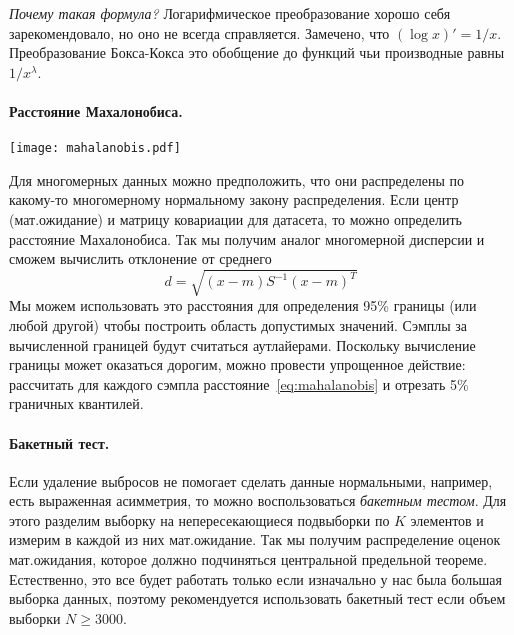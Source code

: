 \documentclass[../handbook.tex]{subfiles}
\begin{document}
{\it Почему такая формула?} Логарифмическое преобразование хорошо себя
зарекомендовало, но оно не всегда справляется. Замечено, что $(\log x)' =
1/x$. Преобразование Бокса-Кокса это обобщение до функций чьи производные
равны $1/x^\lambda$.

\paragraph{Расстояние Махалонобиса.}
\begin{marginfigure}
    \texttt{[image: mahalanobis.pdf]}
\end{marginfigure}
Для многомерных данных можно предположить, что они распределены по какому-то многомерному нормальному закону распределения. Если центр (мат.ожидание) и матрицу ковариации для датасета, то можно определить расстояние Махалонобиса. Так мы получим аналог много\-мерной дисперсии и сможем вычислить отклонение от среднего
\begin{equation}
    \label{eq:mahalanobis}
    d = \sqrt{ (x - m) S^{-1}(x-m)^T}
\end{equation}
Мы можем использовать это расстояния для определения 95\% границы (или любой другой) чтобы построить область допустимых значений. Сэмплы за вычисленной границей будут считаться аутлайерами. Поскольку вычисление границы может оказаться дорогим, можно провести упрощенное действие: рассчитать для каждого сэмпла расстояние~\ref{eq:mahalanobis} и отрезать 5\% граничных квантилей.

\paragraph{Бакетный тест.}

Если удаление выбросов не помогает сделать данные нормальными, например, есть выраженная асимметрия, то можно воспользоваться \emph{бакетным тестом}. Для этого разделим выборку на непересекающиеся подвыборки по $K$ элементов и измерим в каждой из них мат.ожидание. Так мы получим распределение оценок мат.ожидания, которое должно подчиняться центральной предельной теореме. Естественно, это все будет работать только если изначально у нас была большая выборка данных, поэтому рекомендуется использовать бакетный тест если объем выборки $N \geq 3000$.
\end{document}
